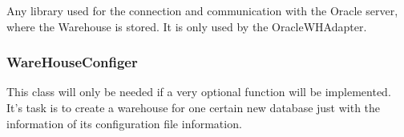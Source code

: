Any library used for the connection and communication with the Oracle server, 
where the Warehouse is stored. It is only used by the OracleWHAdapter.

 

\subsubsection*{WareHouseConfiger}

This class will only be needed if a very optional function will be implemented. It's task is to create
a warehouse for one certain new database just with the information of its configuration file information.

